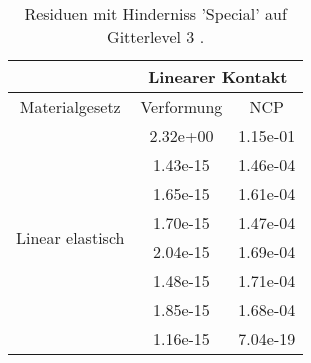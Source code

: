 \begin{table} 
\centering 
\begin{tabular}{c|cc|} 
\cline{2-3} 
 & \multicolumn{2}{|c|}{Linearer Kontakt} \\ 
\hline 
\multicolumn{1}{|c|}{Materialgesetz} & \multicolumn{1}{c|}{Verformung} & \multicolumn{1}{c|}{NCP} \\ 
\hline 
\multicolumn{1}{|c|}{\multirow{8}{*}{Linear elastisch}} &\multicolumn{1}{|c|}{  2.32e+00} & \multicolumn{1}{|c|}{  1.15e-01} \\ 
\multicolumn{1}{|c|}{} & \multicolumn{1}{|c|}{  1.43e-15} & \multicolumn{1}{|c|}{  1.46e-04} \\ 
\multicolumn{1}{|c|}{} & \multicolumn{1}{|c|}{  1.65e-15} & \multicolumn{1}{|c|}{  1.61e-04} \\ 
\multicolumn{1}{|c|}{} & \multicolumn{1}{|c|}{  1.70e-15} & \multicolumn{1}{|c|}{  1.47e-04} \\ 
\multicolumn{1}{|c|}{} & \multicolumn{1}{|c|}{  2.04e-15} & \multicolumn{1}{|c|}{  1.69e-04} \\ 
\multicolumn{1}{|c|}{} & \multicolumn{1}{|c|}{  1.48e-15} & \multicolumn{1}{|c|}{  1.71e-04} \\ 
\multicolumn{1}{|c|}{} & \multicolumn{1}{|c|}{  1.85e-15} & \multicolumn{1}{|c|}{  1.68e-04} \\ 
\multicolumn{1}{|c|}{} & \multicolumn{1}{|c|}{  1.16e-15} & \multicolumn{1}{|c|}{  7.04e-19} \\ 
\hline 
\end{tabular}\caption{Residuen mit Hinderniss 'Special' auf Gitterlevel 3 .}\label{tab:Residuum_Special_level3}
\end{table} 
